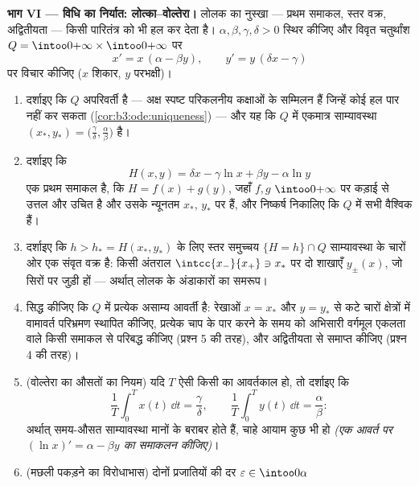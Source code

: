 \begin{problem}
\medskip
\noindent\textbf{भाग VI --- विधि का निर्यात: लोत्का--वोल्तेरा।}
लोलक का नुस्खा --- प्रथम समाकल,  स्तर वक्र, अद्वितीयता ---
किसी पारितंत्र को भी हल कर देता है। $\alpha, \beta, \gamma, \delta > 0$ स्थिर कीजिए और विवृत
चतुर्थांश $Q = \intoo0{+\infty}\times\intoo0{+\infty}$ पर
\[
x' = x\,(\alpha - \beta y), \qquad
y' = y\,(\delta x - \gamma)
\]
पर विचार कीजिए ($x$ शिकार, $y$ परभक्षी)।
\begin{enumerate}[resume]
  \item दर्शाइए कि $Q$ अपरिवर्ती है --- अक्ष स्पष्ट परिकलनीय
        कक्षाओं के सम्मिलन हैं जिन्हें कोई हल पार नहीं कर सकता
        (\cref{cor:b3:ode:uniqueness}) --- और यह कि $Q$ में एकमात्र साम्यावस्था $(x_*, y_*) =
        \bigl(\frac\gamma\delta, \frac\alpha\beta\bigr)$
        है।
  \item दर्शाइए कि
        \[
        H(x, y) = \delta x - \gamma\ln x + \beta y -
        \alpha\ln y
        \]
        एक प्रथम समाकल है, कि $H = f(x) + g(y)$, जहाँ $f, g$ $\intoo0{+\infty}$ पर कड़ाई से
        उत्तल और उचित है और उसके न्यूनतम $x_*$, $y_*$ पर हैं, और
        निष्कर्ष निकालिए कि $Q$ में सभी  वैश्विक हैं।
  \item दर्शाइए कि $h > h_* = H(x_*, y_*)$ के लिए स्तर समुच्चय $\{H = h\}\cap Q$ साम्यावस्था के
        चारों ओर एक संवृत वक्र है: किसी  अंतराल $\intcc{x_-}{x_+} \ni x_*$ पर दो
         शाखाएँ $y_\pm(x)$, जो सिरों पर जुड़ी हों --- अर्थात् लोलक
        के अंडाकारों का समरूप।
  \item सिद्ध कीजिए कि $Q$ में प्रत्येक असाम्य  आवर्ती है:
        रेखाओं $x = x_*$ और $y = y_*$ से कटे चारों क्षेत्रों में
        वामावर्त परिभ्रमण स्थापित कीजिए, प्रत्येक चाप के पार करने
        के समय को अभिसारी वर्गमूल एकलता वाले किसी समाकल से परिबद्ध
        कीजिए (प्रश्न 5 की तरह), और अद्वितीयता से समाप्त कीजिए
        (प्रश्न 4 की तरह)।
  \item (वोल्तेरा का औसतों का नियम) यदि $T$ ऐसी किसी  का
        आवर्तकाल हो, तो दर्शाइए कि
        \[
        \frac1T\int_0^Tx(t)\,\dd t = \frac\gamma\delta,
        \qquad
        \frac1T\int_0^Ty(t)\,\dd t = \frac\alpha\beta :
        \]
        अर्थात् समय-औसत साम्यावस्था मानों के बराबर होते हैं, चाहे
        आयाम कुछ भी हो \emph{(एक आवर्त पर $(\ln x)' =
        \alpha - \beta y$ का समाकलन कीजिए)}।
  \item (मछली पकड़ने का विरोधाभास) दोनों प्रजातियों की दर $\varepsilon \in \intoo0\alpha$

\end{enumerate}
\end{problem}

